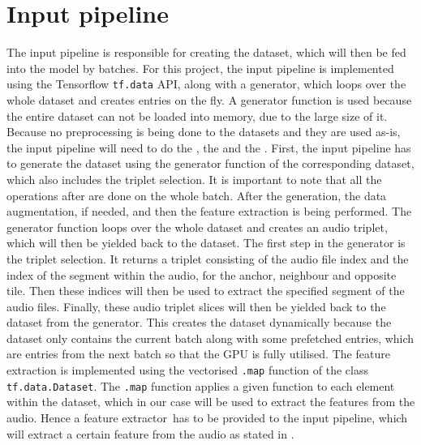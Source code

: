 \section{Input pipeline}
\label{sec:Input-Pipeline}
The input pipeline is responsible for creating the dataset, which will then be fed into the model by batches. For this project, the input pipeline is implemented using the Tensorflow \texttt{tf.data} API\footnotemark, along with a generator, which loops over the whole dataset and creates entries on the fly. A generator function is used because the entire dataset can not be loaded into memory, due to the large size of it.
\newline
\newline
Because no preprocessing is being done to the datasets and they are used as-is, the input pipeline will need to do the , the  and the .
\newline
First, the input pipeline has to generate the dataset using the generator function of the corresponding dataset, which also includes the triplet selection. It is important to note that all the operations after are done on the whole batch. After the generation, the data augmentation, if needed, and then the feature extraction is being performed.
\newline
\newline
The generator function loops over the whole dataset and creates an audio triplet, which will then be yielded back to the dataset. The first step in the generator is the triplet selection. It returns a triplet consisting of the audio file index and the index of the segment within the audio, for the anchor, neighbour and opposite tile. Then these indices will then be used to extract the specified segment of the audio files. Finally, these audio triplet slices will then be yielded back to the dataset from the generator.
\newline
\newline
This creates the dataset dynamically because the dataset only contains the current batch along with some prefetched entries, which are entries from the next batch so that the \gls{GPU} is fully utilised.
\newline
\newline
The feature extraction is implemented using the vectorised \texttt{.map} function of the class \texttt{tf.data.Dataset}\footnotemark. The \texttt{.map} function applies a given function to each element within the dataset, which in our case will be used to extract the features from the audio. Hence a \flqq feature extractor\frqq \ has to be provided to the input pipeline, which will extract a certain feature from the audio as stated in .
